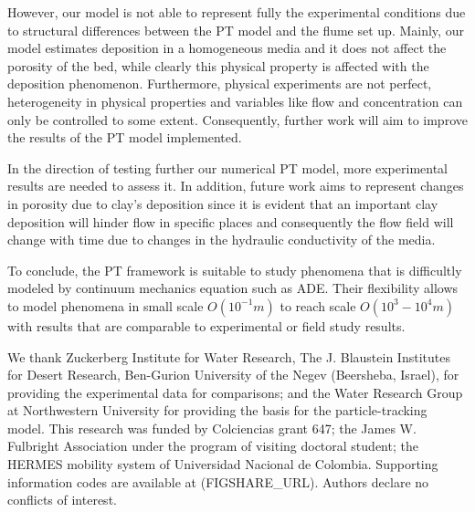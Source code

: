 \documentclass[draft,linenumbers]{agujournal2018}
\begin{document}
However, our model is not able to represent fully the experimental conditions due to structural differences between the PT model and the flume set up. Mainly, our model estimates deposition in a homogeneous media and it does not affect the porosity of the bed, while clearly this physical property is affected with the deposition phenomenon. Furthermore, physical experiments are not perfect, heterogeneity in physical properties and variables like flow and concentration can only be controlled to some extent. Consequently, further work will aim to improve the results of the PT model implemented.

In the direction of testing further our numerical PT model, more experimental results are needed to assess it. In addition, future work aims to represent changes in porosity due to clay's deposition since it is evident that an important clay deposition will hinder flow in specific places and consequently the flow field will change with time due to changes in the hydraulic conductivity of the media. 

To conclude, the PT framework is suitable to study phenomena that is difficultly modeled by continuum mechanics equation such as ADE. Their flexibility allows to model phenomena in small scale $O(10^{-1}m)$ to reach scale $O(10^3-10^4 m)$ with results that are comparable to experimental or field study results.  

\acknowledgments
We thank Zuckerberg Institute for Water Research, The J. Blaustein Institutes for Desert Research, Ben-Gurion University of the Negev (Beersheba, Israel), for providing the experimental data for comparisons; and the Water Research Group at Northwestern University for providing the basis for the particle-tracking model. This research was funded by Colciencias grant 647; the James W. Fulbright Association under the program of visiting doctoral student; the HERMES mobility system of Universidad Nacional de Colombia. Supporting information codes are available at (FIGSHARE\_URL). Authors declare no conflicts of interest.




\end{document}
